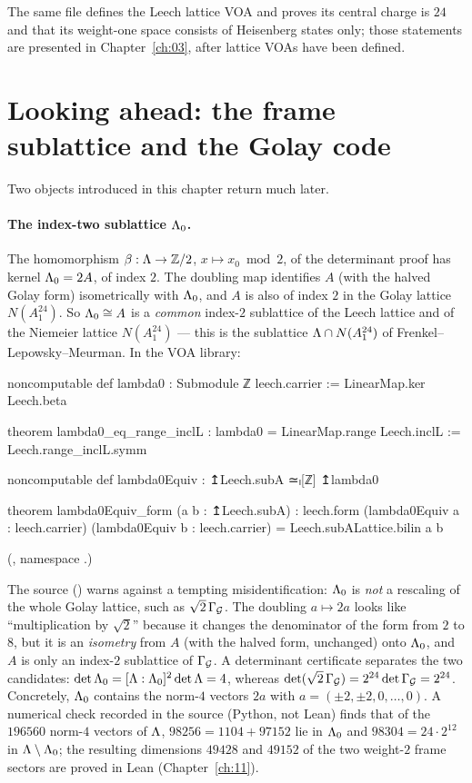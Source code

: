 The same file defines the Leech lattice VOA  and proves its central
charge is $24$ and that its weight-one space consists of Heisenberg states only; those statements
are presented in Chapter~\ref{ch:03}, after lattice VOAs have been defined.

\section{Looking ahead: the frame sublattice and the Golay code}\label{ch02:sec:ahead}

Two objects introduced in this chapter return much later.

\paragraph{The index-two sublattice $\Leech_0$.}  The homomorphism $\beta:{\Lambda}\to{\mathbb{Z}}/2$,
$x\mapsto x_0\bmod2$, of the determinant proof has kernel ${\Lambda}_0=2A$, of index $2$.  The
doubling map identifies $A$ (with the halved Golay form) isometrically with $\Leech_0$, and $A$ is
also of index $2$ in the Golay lattice $N(A_1^{24})$.  So ${\Lambda}_0\cong A$ is a \emph{common}
index-$2$ sublattice of the Leech lattice and of the Niemeier lattice $N(A_1^{24})$ --- this is
the sublattice ${\Lambda}\cap N(A_1^{24})$ of Frenkel--Lepowsky--Meurman.  In the VOA library:
\begin{leancode}
noncomputable def lambda0 : Submodule ℤ leech.carrier := LinearMap.ker Leech.beta

theorem lambda0_eq_range_inclL : lambda0 = LinearMap.range Leech.inclL := Leech.range_inclL.symm

noncomputable def lambda0Equiv : ↥Leech.subA ≃ₗ[ℤ] ↥lambda0

theorem lambda0Equiv_form (a b : ↥Leech.subA) :
    leech.form (lambda0Equiv a : leech.carrier) (lambda0Equiv b : leech.carrier)
      = Leech.subALattice.bilin a b
\end{leancode}
(, namespace .)
\begin{warning}[title={Trap: $\Leech_0$ is not $\sqrt2\,N(A_1^{24})$}]
The source () warns against a tempting misidentification:
$\Leech_0$ is \emph{not} a rescaling of the whole Golay lattice, such as $\sqrt2\,\Gamma_{\mathcal{G}}$.
The doubling $a\mapsto2a$ looks like ``multiplication by $\sqrt2$'' because it changes the
denominator of the form from $2$ to $8$, but it is an \emph{isometry} from $A$ (with the halved
form, unchanged) onto $\Leech_0$, and $A$ is only an index-$2$ sublattice of $\Gamma_{\mathcal{G}}$.  A
determinant certificate separates the two candidates: $\det{\Lambda}_0=[{\Lambda}:{\Lambda}_0]^2\det{\Lambda}=4$,
whereas $\det(\sqrt2\,\Gamma_{\mathcal{G}})=2^{24}\det\Gamma_{\mathcal{G}}=2^{24}$.  Concretely, $\Leech_0$
contains the norm-$4$ vectors $2a$ with $a=(\pm2,\pm2,0,\dots,0)$.  A numerical check recorded in the source
(Python, not Lean) finds that of the $196560$ norm-$4$ vectors of ${\Lambda}$, $98256=1104+97152$ lie
in $\Leech_0$ and $98304=24\cdot2^{12}$ in ${\Lambda}\setminus{\Lambda}_0$; the resulting dimensions
$49428$ and $49152$ of the two weight-$2$ frame sectors are proved in Lean (Chapter~\ref{ch:11}).
\end{warning}

